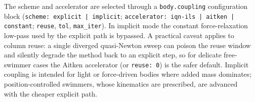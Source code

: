 \documentclass[10pt,onecolumn]{article}
\begin{document}
\medskip
The scheme and accelerator are selected through a \texttt{body.coupling}
configuration block (\texttt{scheme: explicit\,|\,implicit};
\texttt{accelerator: iqn-ils\,|\,aitken\,|\,constant}; \texttt{reuse},
\texttt{tol}, \texttt{max\_iter}).  In implicit mode the constant
force-relaxation low-pass used by the explicit path is bypassed.  A
practical caveat applies to column reuse: a single diverged
quasi-Newton sweep can poison the reuse window and silently degrade the
method back to an explicit step, so for delicate free-swimmer cases the
Aitken accelerator (or \texttt{reuse: 0}) is the safer default.  Implicit
coupling is intended for light or force-driven bodies where added mass
dominates; position-controlled swimmers, whose kinematics are
prescribed, are advanced with the cheaper explicit path.




\end{document}
